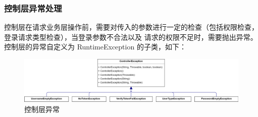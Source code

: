 \documentclass[12pt, a4paper]{article}
\begin{document}
\subsubsection{控制层异常处理}
控制层在请求业务层操作前，需要对传入的参数进行一定的检查（包括权限检查，登录请求类型检查），当登录参数不合法以及
请求的权限不足时，需要抛出异常。控制层的异常自定义为 RuntimeException 的子类，如下：
\begin{figure}[H]
  \centering
  \includegraphics[width = 0.9 \textwidth]{ControllerException.png}
  \caption{控制层异常}
\end{figure}
\end{document}
